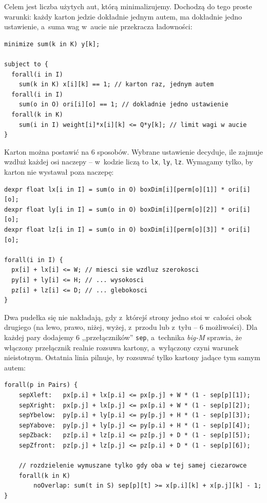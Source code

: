 \documentclass[12pt]{article}
\begin{document}
Celem jest liczba użytych aut, którą minimalizujemy. Dochodzą do tego proste warunki: każdy karton jedzie dokładnie jednym autem, ma dokładnie jedno ustawienie, a~suma wag w~aucie nie przekracza ładowności:

\begin{lstlisting}[language={}]
minimize sum(k in K) y[k];

subject to {
  forall(i in I)
    sum(k in K) x[i][k] == 1; // karton raz, jednym autem
  forall(i in I)
    sum(o in O) ori[i][o] == 1; // dokladnie jedno ustawienie
  forall(k in K)
    sum(i in I) weight[i]*x[i][k] <= Q*y[k]; // limit wagi w aucie
}
\end{lstlisting}

Karton można postawić na 6 sposobów. Wybrane ustawienie decyduje, ile zajmuje wzdłuż każdej osi naczepy -- w~kodzie liczą to \texttt{lx}, \texttt{ly}, \texttt{lz}. Wymagamy tylko, by karton nie wystawał poza naczepę:

\begin{lstlisting}[language={}]
dexpr float lx[i in I] = sum(o in O) boxDim[i][perm[o][1]] * ori[i][o];
dexpr float ly[i in I] = sum(o in O) boxDim[i][perm[o][2]] * ori[i][o];
dexpr float lz[i in I] = sum(o in O) boxDim[i][perm[o][3]] * ori[i][o];

forall(i in I) {
  px[i] + lx[i] <= W; // miesci sie wzdluz szerokosci
  py[i] + ly[i] <= H; // ... wysokosci
  pz[i] + lz[i] <= D; // ... glebokosci
}
\end{lstlisting}

Dwa pudełka się nie nakładają, gdy z~którejś strony jedno stoi w~całości obok drugiego (na lewo, prawo, niżej, wyżej, z~przodu lub z~tyłu -- 6 możliwości). Dla każdej pary dodajemy 6 ,,przełączników'' \texttt{sep}, a~technika \textit{big-M} sprawia, że włączony przełącznik realnie rozsuwa kartony, a~wyłączony czyni warunek nieistotnym. Ostatnia linia pilnuje, by rozsuwać tylko kartony jadące tym samym autem:

\begin{lstlisting}[language={}]
forall(p in Pairs) {
    sepXleft:   px[p.i] + lx[p.i] <= px[p.j] + W * (1 - sep[p][1]);
    sepXright:  px[p.j] + lx[p.j] <= px[p.i] + W * (1 - sep[p][2]);
    sepYbelow:  py[p.i] + ly[p.i] <= py[p.j] + H * (1 - sep[p][3]);
    sepYabove:  py[p.j] + ly[p.j] <= py[p.i] + H * (1 - sep[p][4]);
    sepZback:   pz[p.i] + lz[p.i] <= pz[p.j] + D * (1 - sep[p][5]);
    sepZfront:  pz[p.j] + lz[p.j] <= pz[p.i] + D * (1 - sep[p][6]);

    // rozdzielenie wymuszane tylko gdy oba w tej samej ciezarowce
    forall(k in K)
        noOverlap: sum(t in S) sep[p][t] >= x[p.i][k] + x[p.j][k] - 1;
}
\end{lstlisting}
\end{document}
